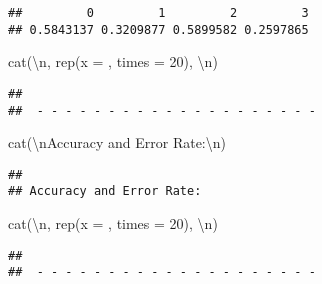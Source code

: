 \documentclass[
]{article}
\newenvironment{Shaded}{\begin{snugshade}}{\end{snugshade}}
\newcommand{\AttributeTok}[1]{\textcolor[rgb]{0.77,0.63,0.00}{#1}}
\newcommand{\DecValTok}[1]{\textcolor[rgb]{0.00,0.00,0.81}{#1}}
\newcommand{\FunctionTok}[1]{\textcolor[rgb]{0.00,0.00,0.00}{#1}}
\newcommand{\NormalTok}[1]{#1}
\newcommand{\SpecialCharTok}[1]{\textcolor[rgb]{0.00,0.00,0.00}{#1}}
\newcommand{\StringTok}[1]{\textcolor[rgb]{0.31,0.60,0.02}{#1}}
\begin{document}
\begin{verbatim}
##         0         1         2         3 
## 0.5843137 0.3209877 0.5899582 0.2597865
\end{verbatim}

\begin{Shaded}
\begin{Highlighting}[]
\FunctionTok{cat}\NormalTok{(}\StringTok{\textquotesingle{}}\SpecialCharTok{\textbackslash{}n}\StringTok{\textquotesingle{}}\NormalTok{, }\FunctionTok{rep}\NormalTok{(}\AttributeTok{x =} \StringTok{\textquotesingle{}{-}\textquotesingle{}}\NormalTok{, }\AttributeTok{times =} \DecValTok{20}\NormalTok{), }\StringTok{\textquotesingle{}}\SpecialCharTok{\textbackslash{}n}\StringTok{\textquotesingle{}}\NormalTok{)}
\end{Highlighting}
\end{Shaded}

\begin{verbatim}
## 
##  - - - - - - - - - - - - - - - - - - - -
\end{verbatim}

\begin{Shaded}
\begin{Highlighting}[]
\FunctionTok{cat}\NormalTok{(}\StringTok{\textquotesingle{}}\SpecialCharTok{\textbackslash{}n}\StringTok{Accuracy and Error Rate:}\SpecialCharTok{\textbackslash{}n}\StringTok{\textquotesingle{}}\NormalTok{)}
\end{Highlighting}
\end{Shaded}

\begin{verbatim}
## 
## Accuracy and Error Rate:
\end{verbatim}

\begin{Shaded}
\begin{Highlighting}[]
\FunctionTok{cat}\NormalTok{(}\StringTok{\textquotesingle{}}\SpecialCharTok{\textbackslash{}n}\StringTok{\textquotesingle{}}\NormalTok{, }\FunctionTok{rep}\NormalTok{(}\AttributeTok{x =} \StringTok{\textquotesingle{}{-}\textquotesingle{}}\NormalTok{, }\AttributeTok{times =} \DecValTok{20}\NormalTok{), }\StringTok{\textquotesingle{}}\SpecialCharTok{\textbackslash{}n}\StringTok{\textquotesingle{}}\NormalTok{)}
\end{Highlighting}
\end{Shaded}

\begin{verbatim}
## 
##  - - - - - - - - - - - - - - - - - - - -
\end{verbatim}
\end{document}

